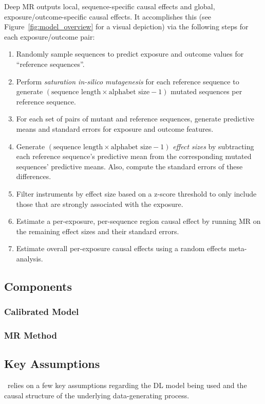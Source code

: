 Deep MR outputs local, sequence-specific causal effects and global, exposure/outcome-specific causal effects. It accomplishes this (see Figure~\ref{fig:model_overview} for a visual depiction) via the following steps for each exposure/outcome pair:
\begin{enumerate}
    \item Randomly sample sequences to predict exposure and outcome values for ``reference sequences''.
    \item Perform \textit{saturation in-silico mutagenesis} for each reference sequence to generate \( (\text{sequence\ length} \times \text{alphabet\ size} - 1) \) mutated sequences per reference sequence.
    \item For each set of pairs of mutant and reference sequences, generate predictive means and standard errors for exposure and outcome features.
    \item Generate \( (\text{sequence length} \times \text{alphabet size} - 1) \) \textit{effect sizes} by subtracting each reference sequence's predictive mean from the corresponding mutated sequences' predictive means. Also, compute the standard errors of these differences.
    \item Filter instruments by effect size based on a z-score threshold to only include those that are strongly associated with the exposure. \label{item:instr_filtering}
    \item Estimate a per-exposure, per-sequence region causal effect by running MR on the remaining effect sizes and their standard errors.
    \item Estimate overall per-exposure causal effects using a random effects meta-analysis.
\end{enumerate}

\subsection{Components}%
\label{sub:meth_components}

\subsubsection{Calibrated Model}%
\label{ssub:calibrated_model}

\subsubsection{MR Method}%
\label{ssub:mr_method}

\subsection{Key Assumptions}%
\label{sub:meth_key_assumptions}
\method\ relies on a few key assumptions regarding the DL model being used and the causal structure of the underlying data-generating process.

